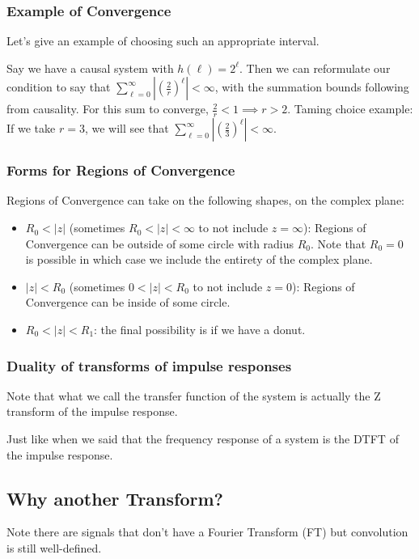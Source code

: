 \subsubsection{Example of Convergence}
Let's give an example of choosing such an appropriate interval.

Say we have a causal system with $h(\ell)=2^\ell$. Then we can reformulate our condition to say that $\sum_{\ell=0}^\infty \left|(\frac 2r)^\ell\right|<\infty$, with the summation bounds following from causality. For this sum to converge, $\frac2r<1\implies r>2$. 
Taming choice example: If we take $r=3$, we will see that $\sum_{\ell=0}^\infty \left|(\frac 23)^\ell\right|<\infty$.

\subsubsection{Forms for Regions of Convergence}
Regions of Convergence can take on the following shapes, on the complex plane:
\begin{itemize}
    \item $R_0 < |z|$ (sometimes $R_0 < |z| <\infty$ to not include $z=\infty$): Regions of Convergence can be outside of some circle with radius $R_0$. Note that $R_0=0$ is possible in which case we include the entirety of the complex plane.
    \item $|z| < R_0$ (sometimes $0<|z|<R_0$ to not include $z=0$): Regions of Convergence can be inside of some circle.
    \item $R_0 < |z| < R_1$: the final possibility is if we have a donut.
\end{itemize}

\subsubsection{Duality of transforms of impulse responses}

Note that what we call the transfer function of the system is actually the Z transform of the impulse response.

Just like when we said that the frequency response of a system is the DTFT of the impulse response. 

\subsection{Why another Transform?}
Note there are signals that don't have a Fourier Transform (FT) but convolution is still well-defined.

